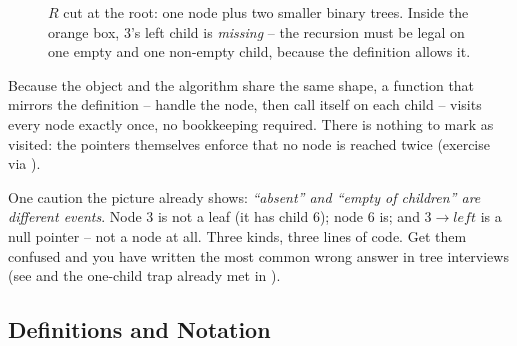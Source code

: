 \begin{figure}[H]
\centering
{}
\caption{$R$ cut at the root: one node plus two smaller binary trees. Inside the
orange box, $3$'s left child is \emph{missing} -- the recursion must be legal on
one empty and one non-empty child, because the definition allows it.}\label{fig:c02-decompose}
\end{figure}

Because the object and the algorithm share the same shape, a function that mirrors
the definition -- handle the node, then call itself on each child -- visits every
node exactly once, no bookkeeping required. There is nothing to mark as visited:
the pointers themselves enforce that no node is reached twice (exercise via
).

One caution the picture already shows: \emph{``absent'' and ``empty of
children'' are different events}. Node $3$ is not a leaf (it has child $6$);
node $6$ is; and $3\to\mathit{left}$ is a null pointer -- not a node at all.
Three kinds, three lines of code. Get them confused and you have written the most
common wrong answer in tree interviews (see  and the
one-child trap already met in ).

\subsection{Definitions and Notation}

